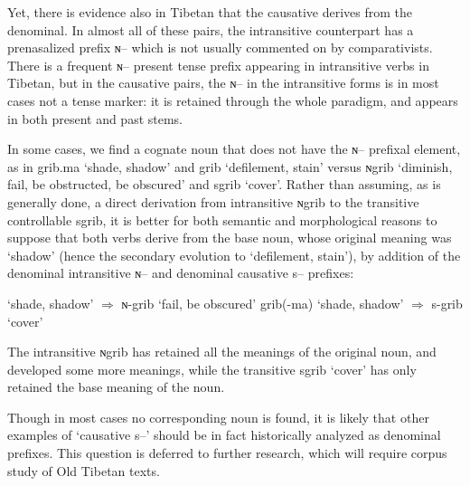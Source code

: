\documentclass[oldfontcommands,oneside,a4paper,11pt]{article}
\newcommand{\ipa}[1]{{\phon \mbox{#1}}} %
\begin{document}
Yet, there is evidence also in Tibetan that the causative derives from the denominal.  In almost all of these pairs, the intransitive counterpart has a prenasalized prefix \ipa{ɴ--} which is not usually commented on by comparativists. There is a frequent \ipa{ɴ--} present tense prefix appearing in intransitive verbs in Tibetan, but in the causative pairs, the  \ipa{ɴ--} in the intransitive forms is in most cases not a tense marker: it is retained through the whole paradigm, and appears in both present and past stems.

 In some cases, we find a cognate noun that does not have the  \ipa{ɴ--} prefixal element, as in \ipa{grib.ma} `shade, shadow'  and \ipa{grib} `defilement, stain' versus \ipa{ɴgrib} `diminish, fail, be obstructed, be obscured' and  \ipa{sgrib} `cover'. Rather than assuming, as is generally done, a direct derivation from intransitive  \ipa{ɴgrib}  to the transitive controllable \ipa{sgrib}, it is better for both semantic and morphological reasons to suppose that both verbs derive from the base noun, whose original meaning was `shadow' (hence the secondary evolution to `defilement, stain'), by addition of the denominal intransitive \ipa{ɴ--} and denominal causative \ipa{s--} prefixes:
 
\begin{exe}
\ex \label{exgrib}
\glt  \ipa{grib(-ma)} `shade, shadow'  $\Rightarrow$   \ipa{ɴ-grib} `fail, be obscured'
\glt 
 \ipa{grib(-ma)} `shade, shadow'  $\Rightarrow$   \ipa{s-grib} `cover'
\end{exe}

The intransitive \ipa{ɴgrib} has retained all the meanings of the original noun, and developed some more meanings, while the transitive \ipa{sgrib} `cover' has only retained the base meaning of the noun.  

Though in most cases no corresponding noun is found, it is likely that other examples of  `causative \ipa{s--}' should be in fact historically analyzed as denominal prefixes. This question is deferred to further research, which will require corpus study of Old Tibetan texts.
\end{document}
